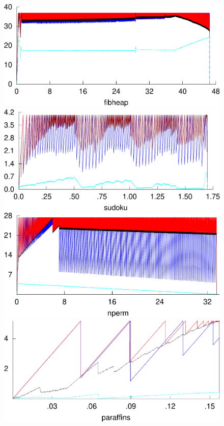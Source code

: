 \documentclass[9pt,preprint,nonatbib]{sigplanconf}
\begin{document}
\begin{figure}[t!]
  \includegraphics[width=\wdh]{fibheap.pdf}
  \includegraphics[width=\wdh]{sudoku.pdf}
  \includegraphics[width=\wdh]{nperm.pdf}\\
  \includegraphics[width=\wdh]{paraffins.pdf}

\end{figure}
\end{document}
